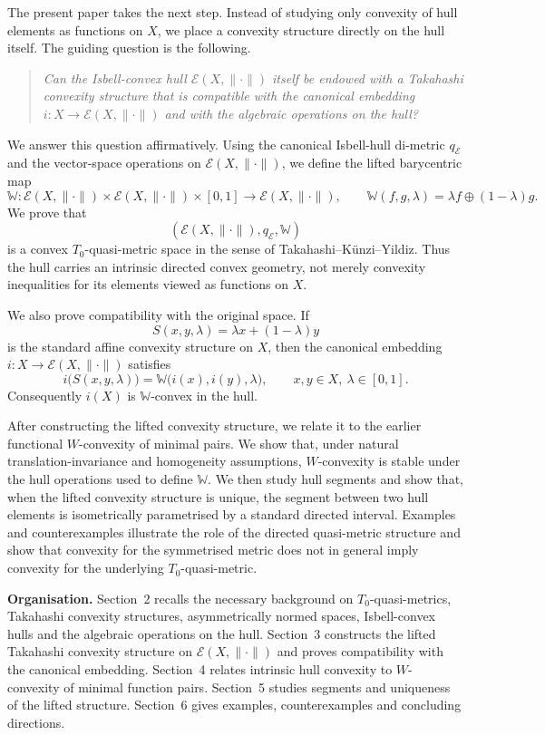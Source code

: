 \documentclass[preprint,12pt]{elsarticle}
\numberwithin{equation}{section}
\newcommand{\E}{\mathcal{E}}
\begin{document}
The present paper takes the next step.  Instead of studying only convexity of
hull elements as functions on \(X\), we place a convexity structure directly
on the hull itself.  The guiding question is the following.

\begin{quote}
\emph{Can the Isbell-convex hull \(\E(X,\|\cdot\|)\) itself be endowed with a
Takahashi convexity structure that is compatible with the canonical embedding
\(i:X\to\E(X,\|\cdot\|)\) and with the algebraic operations on the hull?}
\end{quote}

We answer this question affirmatively.  Using the canonical Isbell-hull
di-metric \(q_{\E}\) and the vector-space operations on
\(\E(X,\|\cdot\|)\), we define the lifted barycentric map
\[
\mathbb W:\E(X,\|\cdot\|)\times \E(X,\|\cdot\|)
\times[0,1]\longrightarrow \E(X,\|\cdot\|),
\qquad
\mathbb W(f,g,\lambda)=\lambda f\oplus(1-\lambda)g.
\]
We prove that
\[
(\E(X,\|\cdot\|),q_{\E},\mathbb W)
\]
is a convex \(T_{0}\)-quasi-metric space in the sense of
Takahashi--K\"unzi--Yildiz.  Thus the hull carries an intrinsic directed
convex geometry, not merely convexity inequalities for its elements viewed as
functions on \(X\).

We also prove compatibility with the original space.  If
\[
S(x,y,\lambda)=\lambda x+(1-\lambda)y
\]
is the standard affine convexity structure on \(X\), then the canonical
embedding \(i:X\to\E(X,\|\cdot\|)\) satisfies
\[
i\bigl(S(x,y,\lambda)\bigr)
=
\mathbb W\bigl(i(x),i(y),\lambda\bigr),
\qquad x,y\in X,\ \lambda\in[0,1].
\]
Consequently \(i(X)\) is \(\mathbb W\)-convex in the hull.

After constructing the lifted convexity structure, we relate it to the earlier
functional \(W\)-convexity of minimal pairs.  We show that, under natural
translation-invariance and homogeneity assumptions, \(W\)-convexity is stable
under the hull operations used to define \(\mathbb W\).  We then study hull
segments and show that, when the lifted convexity structure is unique, the
segment between two hull elements is isometrically parametrised by a standard
directed interval.  Examples and counterexamples illustrate the role of the
directed quasi-metric structure and show that convexity for the symmetrised
metric does not in general imply convexity for the underlying
\(T_{0}\)-quasi-metric.

\medskip

\noindent\textbf{Organisation.}
Section~2 recalls the necessary background on \(T_{0}\)-quasi-metrics,
Takahashi convexity structures, asymmetrically normed spaces, Isbell-convex
hulls and the algebraic operations on the hull.  Section~3 constructs the
lifted Takahashi convexity structure on \(\E(X,\|\cdot\|)\) and proves
compatibility with the canonical embedding.  Section~4 relates intrinsic hull
convexity to \(W\)-convexity of minimal function pairs.  Section~5 studies
segments and uniqueness of the lifted structure.  Section~6 gives examples,
counterexamples and concluding directions.
\end{document}
